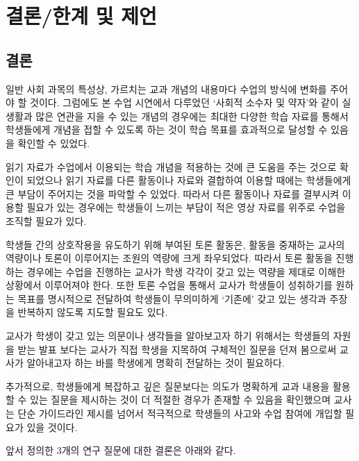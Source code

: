 \documentclass[10pt, a4paper, chapter]{oblivoir}
\begin{document}
\chapter{결론/한계 및 제언}

    \section{결론}
    일반 사회 과목의 특성상, 가르치는 교과 개념의 내용마다 수업의 방식에 변화를 주어야 할 것이다.
    그럼에도 본 수업 시연에서 다루었던 `사회적 소수자 및 약자'와 같이 실생활과 많은 연관을 지을 수 있는 개념의 경우에는 최대한 다양한 학습 자료를 통해서 학생들에게 개념을 접할 수 있도록 하는 것이 학습 목표를 효과적으로 달성할 수 있음을 확인할 수 있었다. 

    읽기 자료가 수업에서 이용되는 학습 개념을 적용하는 것에 큰 도움을 주는 것으로 확인이 되었으나 
    읽기 자료를 다른 활동이나 자료와 결합하여 이용할 때에는 학생들에게 큰 부담이 주어지는 것을 
    파악할 수 있었다. 따라서 다른 활동이나 자료를 결부시켜 이용할 필요가 있는 경우에는 학생들이
    느끼는 부담이 적은 영상 자료를 위주로 수업을 조직할 필요가 있다. 

    학생들 간의 상호작용을 유도하기 위해 부여된 토론 활동은, 활동을 중재하는 교사의 역량이나 
    토론이 이루어지는 조원의 역량에 크게 좌우되었다. 따라서 토론 활동을 진행하는 경우에는 수업을 
    진행하는 교사가 학생 각각이 갖고 있는 역량을 제대로 이해한 상황에서 이루어져야 한다. 
    또한 토론 수업을 통해서 교사가 학생들이 성취하기를 원하는 목표를 명시적으로 전달하여 학생들이 
    무의미하게 `기존에' 갖고 있는 생각과 주장을 반복하지 않도록 지도할 필요도 있다. 

    교사가 학생이 갖고 있는 의문이나 생각들을 알아보고자 하기 위해서는 학생들의 자원을 받는 발표
    보다는 교사가 직접 학생을 지목하여 구체적인 질문을 던져 봄으로써 교사가 알아내고자 하는 바를
    학생에게 명확히 전달하는 것이 필요하다. 
    
    추가적으로, 학생들에게 복잡하고 깊은 질문보다는 의도가 명확하게 교과 내용을 활용할 수 있는 질문을 제시하는 것이 더 적절한 경우가 존재할 수 있음을 확인했으며 교사는 단순 가이드라인
    제시를 넘어서 적극적으로 학생들의 사고와 수업 참여에 개입할 필요가 있을 것이다. \newline
    
\noindent
    앞서 정의한 3개의 연구 질문에 대한 결론은 아래와 같다. 
    
\end{document}
